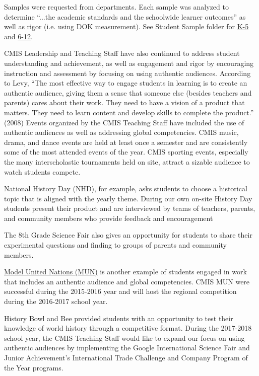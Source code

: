 \begin{findings}

Samples were requested from departments. Each sample was analyzed to determine “...the academic standards and the schoolwide learner outcomes” as well as rigor (i.e. using DOK measurement). See Student Sample folder for \href{https://drive.google.com/drive/folders/0ByVFfrm0zfolVGJzdXpvLV9reVk?usp=sharing}{K-5} and  \href{https://drive.google.com/drive/folders/0ByVFfrm0zfolMkF5aThoSzZxa1E?usp=sharing}{6-12}. 


CMIS Leadership and Teaching Staff have also continued to address student understanding and achievement, as well as engagement and rigor by encouraging instruction and assessment by focusing on using authentic audiences. According to Levy, “The most effective way to engage  students in learning is to create an authentic audience, giving them a sense that someone else (besides teachers and parents) cares about their work. They need to have a vision of a product that matters. They need to learn content and develop skills to complete the product.” (2008)  Events organized by the CMIS Teaching Staff have included the use of authentic audiences as well as addressing global competencies.  CMIS music, drama, and dance events are held at least once a semester and are consistently some of the most attended events of the year. CMIS sporting events, especially the many interscholastic tournaments held on site, attract a sizable audience to watch students compete. 

National History Day (NHD), for example, asks students to choose a historical  topic that is aligned with the yearly theme. During our own on-site History Day students present their product and are interviewed by teams of teachers, parents, and community members who provide feedback and encouragement

The 8th Grade Science Fair also gives an opportunity for students to share their experimental questions and finding to groups of parents and community members. 

\href{https://drive.google.com/drive/folders/0Bwo-i12FeO0rVmRhaGd4QlE5ek0?usp=sharing}{Model United Nations (MUN)} is another example of students engaged in work that includes an authentic audience and global competencies. CMIS MUN were successful during the 2015-2016 year and will host the regional competition during the 2016-2017 school year. 

History Bowl and Bee provided students with an opportunity to test their knowledge of world history through a competitive format. 
During the 2017-2018 school year, the CMIS Teaching Staff would like to expand our focus on using authentic audiences by implementing the Google International Science Fair and Junior Achievement’s International Trade Challenge and  Company Program of the Year programs. 


\end{findings}
